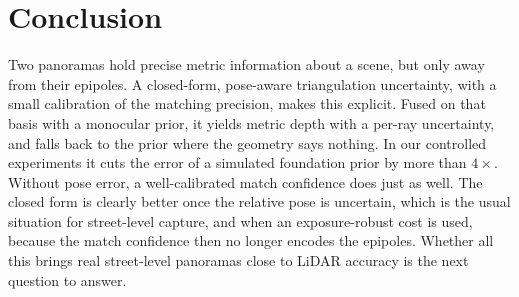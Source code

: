 \section{Conclusion}
Two panoramas hold precise metric information about a scene, but only away from their epipoles. A
closed-form, pose-aware triangulation uncertainty, with a small calibration of the matching precision,
makes this explicit. Fused on that basis with a monocular prior, it yields metric depth with a per-ray
uncertainty, and falls back to the prior where the geometry says nothing. In our controlled
experiments it cuts the error of a simulated foundation prior by more than $4\times$. Without pose
error, a well-calibrated match confidence does just as well. The closed form is clearly better once
the relative pose is uncertain, which is the usual situation for street-level capture, and when an
exposure-robust cost is used, because the match confidence then no longer encodes the epipoles.
Whether all this brings real street-level panoramas close to LiDAR accuracy is the next question to
answer.
